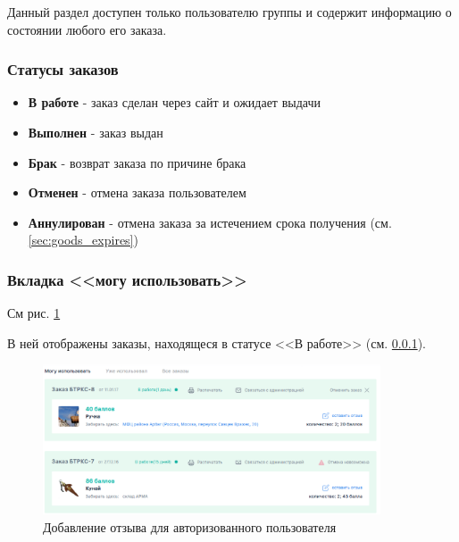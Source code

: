            Данный раздел доступен только пользователю группы 
            и содержит информацию о состоянии любого его заказа.

            \subsubsection{Статусы заказов}\label{sec:auth_order_statuses}
            
            \begin{itemize}
                \item \textbf{В работе} - заказ сделан через сайт и ожидает выдачи
                \item \textbf{Выполнен} - заказ выдан
                \item \textbf{Брак} - возврат заказа по причине брака
                \item \textbf{Отменен} - отмена заказа пользователем
                \item \textbf{Аннулирован} - отмена заказа за истечением срока получения
                (см. \ref{sec:goods_expires})

            \end{itemize}

            \subsubsection{Вкладка <<могу использовать>>}
            См рис. \ref{fig:auth_orders_may_use}

            В ней отображены заказы, находящеся в статусе <<В работе>> (см.
            \ref{sec:auth_order_statuses}).

            \begin{figure}
                \center
                \includegraphics[width=100mm]{04_auth_funcs/figures/08.eps}
                \caption{Добавление отзыва для авторизованного пользователя}
                \label{fig:auth_orders_may_use}
            \end{figure}

